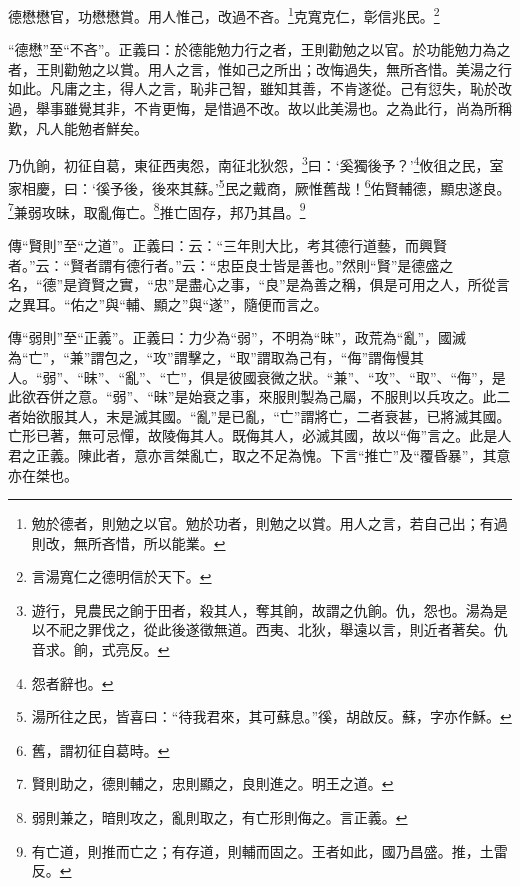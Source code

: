 德懋懋官，功懋懋賞。用人惟己，改過不吝。\footnote{勉於德者，則勉之以官。勉於功者，則勉之以賞。用人之言，若自己出；有過則改，無所吝惜，所以能業。}克寬克仁，彰信兆民。\footnote{言湯寬仁之德明信於天下。}

{\noindent\shu{}\fzkt “德懋”至“不吝”。正義曰：於德能勉力行之者，王則勸勉之以官。於功能勉力為之者，王則勸勉之以賞。用人之言，惟如己之所出；改悔過失，無所吝惜。美湯之行如此。凡庸之主，得人之言，恥非己智，雖知其善，不肯遂從。己有愆失，恥於改過，舉事雖覺其非，不肯更悔，是惜過不改。故以此美湯也。之為此行，尚為所稱歎，凡人能勉者鮮矣。 \par}

乃仇餉，初征自葛，東征西夷怨，南征北狄怨，\footnote{遊行，見農民之餉于田者，殺其人，奪其餉，故謂之仇餉。仇，怨也。湯為是以不祀之罪伐之，從此後遂徵無道。西夷、北狄，舉遠以言，則近者著矣。仇音求。餉，式亮反。}曰：‘奚獨後予？’\footnote{怨者辭也。}攸徂之民，室家相慶，曰：‘徯予後，後來其蘇。’\footnote{湯所往之民，皆喜曰：“待我君來，其可蘇息。”徯，胡啟反。蘇，字亦作穌。}民之戴商，厥惟舊哉！\footnote{舊，謂初征自葛時。}佑賢輔德，顯忠遂良。\footnote{賢則助之，德則輔之，忠則顯之，良則進之。明王之道。}兼弱攻昧，取亂侮亡。\footnote{弱則兼之，暗則攻之，亂則取之，有亡形則侮之。言正義。}推亡固存，邦乃其昌。\footnote{有亡道，則推而亡之；有存道，則輔而固之。王者如此，國乃昌盛。推，土雷反。}

{\noindent\zhuan{}\fzbyks 傳“賢則”至“之道”。正義曰：云：“三年則大比，考其德行道藝，而興賢者。”云：“賢者謂有德行者。”云：“忠臣良士皆是善也。”然則“賢”是德盛之名，“德”是資賢之實，“忠”是盡心之事，“良”是為善之稱，俱是可用之人，所從言之異耳。“佑之”與“輔、顯之”與“遂”，隨便而言之。 \par}

{\noindent\zhuan{}\fzbyks 傳“弱則”至“正義”。正義曰：力少為“弱”，不明為“昧”，政荒為“亂”，國滅為“亡”，“兼”謂包之，“攻”謂擊之，“取”謂取為己有，“侮”謂侮慢其人。“弱”、“昧”、“亂”、“亡”，俱是彼國衰微之狀。“兼”、“攻”、“取”、“侮”，是此欲吞併之意。“弱”、“昧”是始衰之事，來服則製為己屬，不服則以兵攻之。此二者始欲服其人，末是滅其國。“亂”是已亂，“亡”謂將亡，二者衰甚，已將滅其國。亡形已著，無可忌憚，故陵侮其人。既侮其人，必滅其國，故以“侮”言之。此是人君之正義。陳此者，意亦言桀亂亡，取之不足為愧。下言“推亡”及“覆昏暴”，其意亦在桀也。 \par}

